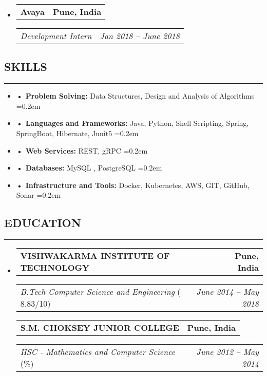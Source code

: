 \documentclass[a4paper]{article}
\makeatletter
\newcommand{\headerrow}[2]
{\begin{tabular*}{\linewidth}{l@{\extracolsep{\fill}}r}
#1 &
#2 \\
\end{tabular*}}
\makeatother
\begin{document}
\begin{itemize}[leftmargin=1em]
	      
	      	      	      
	\item
	      \headerrow
	      {\textbf{ Avaya }}
	      {\textbf{Pune, India}}
	      \headerrow
	      {\emph{Development Intern}}
	      {\emph{Jan 2018 -- June 2018}}
	      	      	      
\end{itemize}


\subsection*{\large SKILLS}
\hrule
\vspace{1em}

\begin{itemize} [leftmargin=1em,noitemsep]
    \parskip=0.2em
	\item \textbf{• Problem Solving:}
	     Data Structures, Design and Analysis of Algorithms
	     \parskip=0.2em
	\item \textbf{• Languages and Frameworks:}
	      Java, Python, Shell  Scripting, Spring, SpringBoot, Hibernate, Junit5
	      \parskip=0.2em
	\item \textbf{• Web Services:}
	      REST, gRPC
	      \parskip=0.2em
	\item \textbf{• Databases:}
	      MySQL , PostgreSQL
	      \parskip=0.2em
	\item \textbf{• Infrastructure and Tools:}
	      Docker, Kubernetes, AWS, GIT, GitHub, Sonar
	      \parskip=0.2em
	      

\end{itemize}


\subsection*{\large EDUCATION}
\hrule
\vspace{1em}

\begin{itemize}[leftmargin=1em]
	\parskip=0.2em
	\item
	      \headerrow
	      {\textbf{VISHWAKARMA INSTITUTE OF TECHNOLOGY}}
	      {\textbf{Pune, India}}
	      \headerrow
	      {\emph{B.Tech Computer Science and Engineering} (\text{CPI:} 8.83/10)}
	      {\emph{June 2014 -- May 2018}}
	      \headerrow
	      {\textbf{S.M. CHOKSEY JUNIOR COLLEGE }}
	      {\textbf{Pune, India}}
	      \headerrow
	      {\emph{HSC - Mathematics and Computer Science} (\text 83.85\%)}
	      {\emph{June 2012 -- May 2014}}
	   
	      	      	      
\end{itemize}
\end{document}
